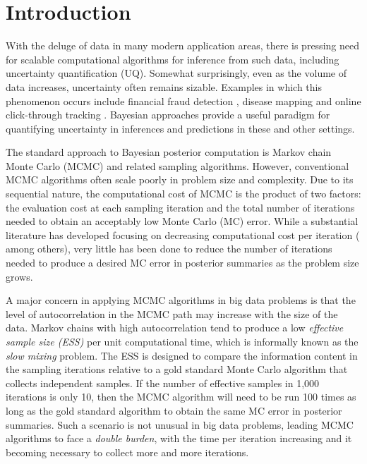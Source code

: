 \documentclass[12pt]{article}
\begin{document}
\vfill

\newpage



\section{Introduction}

With the deluge of data in many modern application areas, there is pressing need for scalable computational algorithms for inference from such data, including uncertainty quantification (UQ).  Somewhat surprisingly, even as the volume of data increases, uncertainty often remains sizable.  Examples in which this phenomenon occurs include financial fraud detection \citep{ngai2011application}, disease mapping \citep{wakefield2007disease} and online click-through tracking \citep{wang2010click}.  Bayesian approaches provide a useful paradigm for quantifying uncertainty in inferences and predictions in these and other settings.

The standard approach to Bayesian posterior computation is Markov chain Monte Carlo (MCMC) and related sampling algorithms. However,  conventional MCMC algorithms often scale poorly in problem size and complexity. Due to its sequential nature, the computational cost of MCMC is the product of two factors: the evaluation cost at each sampling iteration and the total number of iterations needed to obtain an acceptably low Monte Carlo (MC) error. While a substantial literature has developed focusing on decreasing computational cost per iteration (\cite{minsker2014robust,maclaurin2014firefly,
srivastava2015wasp,conrad2015accelerating} among others), {very little has been done
to reduce the} {number of iterations needed to produce a desired MC error in posterior summaries} 
{as the problem size grows.}

{A major concern in applying MCMC algorithms in big data problems is that the level of autocorrelation in the MCMC path may increase with the size of the data.  Markov chains with high autocorrelation 
tend to produce a low {\em effective sample size (ESS)} per unit computational time, {which is informally known as the  {\em slow mixing} problem}.  The ESS is designed to compare the information content in the sampling iterations relative to a gold standard Monte Carlo algorithm that collects independent samples.  If the number of effective samples in 1,000 iterations is only 10, then the MCMC algorithm will need to be run 100 times as long as the gold standard algorithm to obtain the same MC error in posterior summaries.  Such a scenario is not unusual in big data problems, leading MCMC algorithms to face a {\em double burden}, with the time per iteration increasing and it becoming necessary to collect more and more iterations.} 
\end{document}
